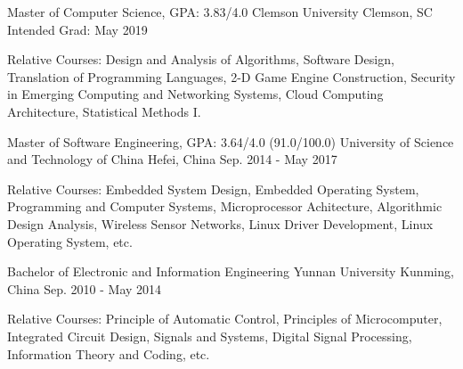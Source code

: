 

\begin{cventries}

  \cventry
    {Master of Computer Science, GPA: 3.83/4.0} %
    {Clemson University} %
    {Clemson, SC} %
    {Intended Grad: May 2019} %
    {
      \begin{cvitems} %
        \item {Relative Courses: Design and Analysis of Algorithms, Software Design, Translation of Programming Languages, 2-D Game Engine Construction, Security in Emerging Computing and Networking Systems, Cloud Computing Architecture, Statistical Methods I.}
      \end{cvitems}
    }

  \cventry
    {Master of Software Engineering, GPA: 3.64/4.0 (91.0/100.0)} %
    {University of Science and Technology of China} %
    {Hefei, China} %
    {Sep. 2014 - May 2017} %
    {
      \begin{cvitems} %
        \item {Relative Courses: Embedded System Design, Embedded Operating System, Programming and Computer Systems, Microprocessor Achitecture, Algorithmic Design Analysis, Wireless Sensor Networks, Linux Driver Development, Linux Operating System, etc.}
      \end{cvitems}
    }

  \cventry
    {Bachelor of Electronic and Information Engineering} %
    {Yunnan University} %
    {Kunming, China} %
    {Sep. 2010 - May 2014} %
    {
      \begin{cvitems} %
        \item {Relative Courses: Principle of Automatic Control, Principles of Microcomputer, Integrated Circuit Design, Signals and Systems, Digital Signal Processing, Information Theory and Coding, etc.}
      \end{cvitems}
    }

\end{cventries}
